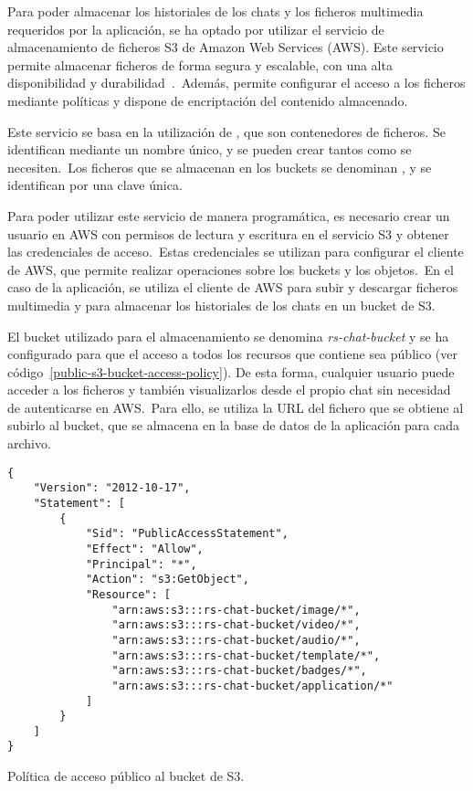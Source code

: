 
Para poder almacenar los historiales de los chats y los ficheros multimedia requeridos por la aplicación, se ha
optado por utilizar el servicio de almacenamiento de ficheros S3 de Amazon Web Services (AWS).
Este servicio permite almacenar ficheros de forma segura y escalable, con una alta disponibilidad
y durabilidad~\cite{AWSAlmac67:online}.\ Además, permite configurar el acceso a los ficheros mediante políticas
y dispone de encriptación del contenido almacenado.

Este servicio se basa en la utilización de , que son contenedores de ficheros.
Se identifican mediante un nombre único, y se pueden crear tantos como se necesiten.\ Los ficheros que se almacenan
en los buckets se denominan , y se identifican por una clave única.

Para poder utilizar este servicio de manera programática, es necesario crear un usuario en AWS con permisos de lectura
y escritura en el servicio S3 y obtener las credenciales de acceso.\ Estas credenciales se utilizan para configurar
el cliente de AWS, que permite realizar operaciones sobre los buckets y los objetos.\ En el caso de la aplicación,
se utiliza el cliente de AWS para subir y descargar ficheros multimedia y para almacenar los historiales de los
chats en un bucket de S3.

El bucket utilizado para el almacenamiento se denomina \textit{rs-chat-bucket} y se ha configurado para que el acceso
a todos los recursos que contiene sea público (ver código~\ref{public-s3-bucket-access-policy}).
De esta forma, cualquier usuario puede acceder a los ficheros y también
visualizarlos desde el propio chat sin necesidad de autenticarse en AWS.\ Para ello, se utiliza la URL del fichero
que se obtiene al subirlo al bucket, que se almacena en la base de datos de la aplicación para cada archivo.

\begin{codeBlock}
	\begin{verbatim}
{
    "Version": "2012-10-17",
    "Statement": [
        {
            "Sid": "PublicAccessStatement",
            "Effect": "Allow",
            "Principal": "*",
            "Action": "s3:GetObject",
            "Resource": [
                "arn:aws:s3:::rs-chat-bucket/image/*",
                "arn:aws:s3:::rs-chat-bucket/video/*",
                "arn:aws:s3:::rs-chat-bucket/audio/*",
                "arn:aws:s3:::rs-chat-bucket/template/*",
                "arn:aws:s3:::rs-chat-bucket/badges/*",
                "arn:aws:s3:::rs-chat-bucket/application/*"
            ]
        }
    ]
}
	\end{verbatim}
	\caption{Política de acceso público al bucket de S3.}
	\label{public-s3-bucket-access-policy}
\end{codeBlock}

